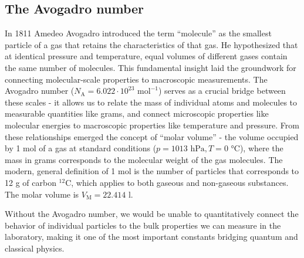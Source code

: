 \documentclass[
  a4paper,
]{book}
\begin{document}
\subsection{The Avogadro number}\label{the-avogadro-number}

In 1811 Amedeo Avogadro introduced the term ``molecule'' as the smallest
particle of a gas that retains the characteristics of that gas. He
hypothesized that at identical pressure and temperature, equal volumes
of different gases contain the same number of molecules. This
fundamental insight laid the groundwork for connecting molecular-scale
properties to macroscopic measurements. The Avogadro number
(\(N_{\mbox{A}} = 6.022 \cdot 10^{23} \mbox{ mol}^{-1}\)) serves as a
crucial bridge between these scales - it allows us to relate the mass of
individual atoms and molecules to measurable quantities like grams, and
connect microscopic properties like molecular energies to macroscopic
properties like temperature and pressure. From these relationships
emerged the concept of ``molar volume'' - the volume occupied by 1 mol
of a gas at standard conditions
(\(p = 1013\mbox{ hPa}, T = 0 \mbox{ °C}\)), where the mass in grams
corresponds to the molecular weight of the gas molecules. The modern,
general definition of 1 mol is the number of particles that corresponds
to 12 g of carbon \({}^{12}\mbox{C}\), which applies to both gaseous and
non-gaseous substances. The molar volume is
\(V_{\mathrm{M}} = 22.414\mbox{ l}\).

Without the Avogadro number, we would be unable to quantitatively
connect the behavior of individual particles to the bulk properties we
can measure in the laboratory, making it one of the most important
constants bridging quantum and classical physics.
\end{document}
